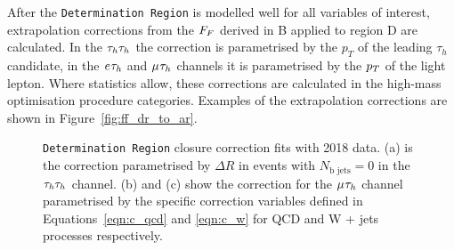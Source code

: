 After the \texttt{Determination Region} is modelled well for all variables of interest, extrapolation corrections from the $F_{F}$ derived in B applied to region D are calculated.
In the $\tau_{h}\tau_{h}$ the correction is parametrised by the $p_{T}$ of the leading $\tau_h$ candidate, in the $e_{}\tau_{h}$ and $\mu_{}\tau_{h}$ channels it is parametrised by the $p_{T}$ of the light lepton.
Where statistics allow, these corrections are calculated in the high-mass optimisation procedure categories.
Examples of the extrapolation corrections are shown in Figure~\ref{fig:ff_dr_to_ar}.

\begin{figure}[!hbtp]
\centering
\caption[Plots of fake factor \texttt{Determination Region} closure correction fits.]{\texttt{Determination Region} closure correction fits with 2018 data. (a) is the correction parametrised by $\Delta R$ in events with $N_{\text{b jets}}=0$ in the $\tau_{h}\tau_{h}$ channel. (b) and (c) show the correction for the $\mu_{}\tau_{h}$ channel parametrised by the specific correction variables defined in Equations~\ref{eqn:c_qcd} and \ref{eqn:c_w} for QCD and W + jets processes respectively.}
\label{fig:ff_dr}
\end{figure}

